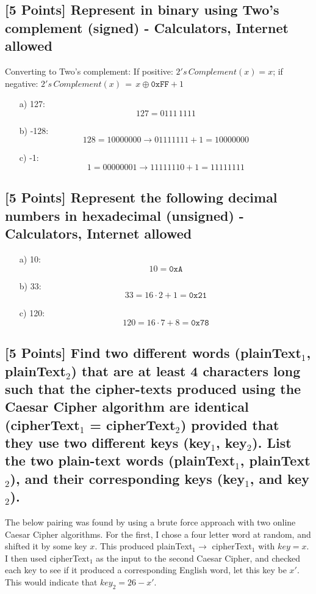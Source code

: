 \documentclass{article}
\begin{document}
\subsection*{[5 Points] Represent in binary using Two's complement (signed) - Calculators, Internet allowed}
Converting to Two's complement:  \newline
If positive: $2's \, Complement(x) = x $; if negative: $2's \, Complement(x) \, = \, x \oplus \mathtt{0xFF} + 1$

\begin{enumerate}
  \setlength{\itemsep}{20pt}%
  \item[a)]127: 
  $$ 127 = \boxed{0111 \, 1111} $$
  \item[b)]-128:
  $$ 128 = 1000 0000 \rightarrow 0111 1111 + 1 = \boxed{1000 0000} $$
  \item[c)]-1:
  $$ 1 = 0000 0001 \rightarrow 1111 1110 + 1 = \boxed{1111 1111} $$
\end{enumerate}

\subsection*{[5 Points] Represent the following decimal numbers in hexadecimal (unsigned) - Calculators, Internet allowed}
\begin{enumerate}
  \setlength{\itemsep}{20pt}
  \item[a)] 10:
  $$ 10 = \boxed{\mathtt{0xA}} $$
  \item[b)] 33:
  $$ 33 = 16 \cdot 2 + 1 = \boxed{\mathtt{0x21}} $$
  \item[c)] 120:
  $$ 120 = 16 \cdot 7 + 8 = \boxed{\mathtt{0x78}} $$
  \item[]
\end{enumerate} 
\subsection*{[5 Points] Find two different words (plainText$_1$, plainText$_2$) that are at least 4 characters long such that the cipher-texts produced using the Caesar Cipher algorithm are identical (cipherText$_1$ = cipherText$_2$) provided that they use two different keys (key$_1$, key$_2$). List the two plain-text words (plainText$_1$, plainText$_2$),  and their corresponding keys (key$_1$, and key$_2$). }

The below pairing was found by using a brute force approach with two online Caesar Cipher algorithms.  For the first, I chose a four letter word at random, and shifted it by some key $x$.  This produced plainText$_1 \rightarrow $ cipherText$_1$ with $key=x$.  I then used cipherText$_1$ as the input to the second Caesar Cipher, and checked each key to see if it produced a corresponding English word, let this key be $x'$.  This would indicate that $key_2 = 26 - x'$.
\end{document}
